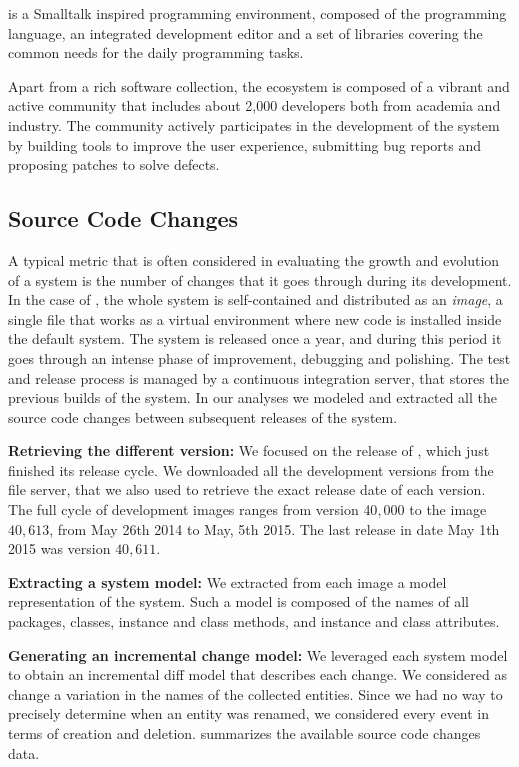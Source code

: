 \pha is a Smalltalk inspired programming environment, composed of the \pha programming language, an integrated development editor and a set of libraries covering the common needs for the daily programming tasks.

Apart from a rich software collection, the \pha ecosystem is composed of a vibrant and active community that includes about 2,000 developers both from academia and industry.
The community actively participates in the development of the system by building tools to improve the user experience, submitting bug reports and proposing patches to solve defects.



\subsection{Source Code Changes}\label{sub:changes}

A typical metric that is often considered in evaluating the growth and evolution of a system is the number of changes that it goes through during its development.
In the case of \pha, the whole system is self-contained and distributed as an \emph{image}, a single file that works as a virtual environment where new code is installed inside the default system.
The \pha system is released once a year, and during this period it goes through an intense phase of improvement, debugging and polishing.
The test and release process is managed by a continuous integration server, that stores the previous builds of the system.
In our analyses we modeled and extracted all the source code changes between subsequent releases of the \pha system.

{\bfseries Retrieving the different version:} We focused on the release of , which just finished its release cycle.
We downloaded all the development versions from the file server, that we also used to retrieve the exact release date of each version.
The full cycle of development images ranges from version $40,000$ to the image $40,613$, from May 26th 2014 to May, 5th 2015.
The last release in date May 1th 2015 was version $40,611$.

{\bfseries Extracting a system model:} We extracted from each image a model representation of the system.
Such a model is composed of the names of all packages, classes, instance and class methods, and instance and class attributes.

{\bfseries Generating an incremental change model:} We leveraged each system model to obtain an incremental diff model that describes each change.
We considered as change a variation in the names of the collected entities.
Since we had no way to precisely determine when an entity was renamed, we considered every event in terms of creation and deletion.
 summarizes the available source code changes data.

